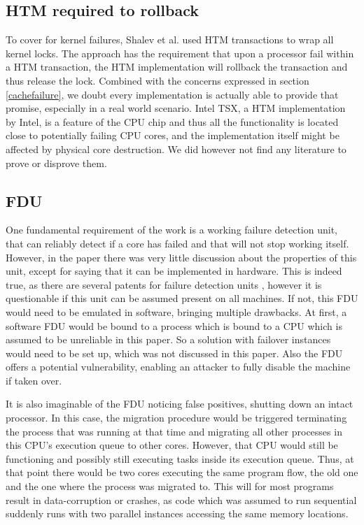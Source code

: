 \documentclass[a4paper,10pt,twoside]{article}
\begin{document}
\subsection{HTM required to rollback}
To cover for kernel failures, Shalev et al. used HTM transactions to wrap all kernel locks. The approach has the requirement that upon a processor fail within a HTM transaction, the HTM implementation will rollback the transaction and thus release the lock. Combined with the concerns expressed in section \ref{cachefailure}, we doubt every implementation is actually able to provide that promise, especially in a real world scenario. Intel TSX, a HTM implementation by Intel, is a feature of the CPU chip and thus all the functionality is located close to potentially failing CPU cores, and the implementation itself might be affected by physical core destruction. We did however not find any literature to prove or disprove them.

\subsection{FDU} \label{fdu}
One fundamental requirement of the work is a working failure detection unit, that can reliably detect if a core has failed and that will not stop working itself. However, in the paper there was very little discussion about the properties of this unit, except for saying that it can be implemented in hardware. This is indeed true, as there are several patents for failure detection units \cite{IBMFDU} \cite{FujitsuFDU}, however it is questionable if this unit can be assumed present on all machines. If not, this FDU would need to be emulated in software, bringing multiple drawbacks. At first, a software FDU would be bound to a process which is bound to a CPU which is assumed to be unreliable in this paper. So a solution with failover instances would need to be set up, which was not discussed in this paper. Also the FDU offers a potential vulnerability, enabling an attacker to fully disable the machine if taken over.

It is also imaginable of the FDU noticing false positives, shutting down an intact processor. In this case, the migration procedure would be triggered terminating the process that was running at that time and migrating all other processes in this CPU's execution queue to other cores. However, that CPU would still be functioning and possibly still executing tasks inside its execution queue. Thus, at that point there would be two cores executing the same program flow, the old one and the one where the process was migrated to. This will for most programs result in data-corruption or crashes, as code which was assumed to run sequential suddenly runs with two parallel instances accessing the same memory locations.
\end{document}
